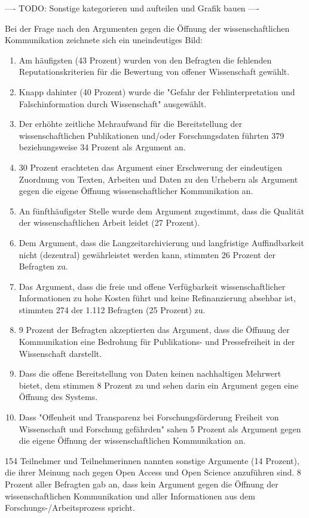 ---- TODO: Sonstige kategorieren und aufteilen und Grafik bauen ----

Bei der Frage nach den Argumenten gegen die Öffnung der wissenschaftlichen Kommunikation zeichnete sich ein uneindeutiges Bild:
\begin{enumerate}
\item Am häufigsten (43 Prozent) wurden von den Befragten die fehlenden Reputationskriterien für die Bewertung von offener Wissenschaft gewählt.
\item Knapp dahinter (40 Prozent) wurde die "Gefahr der Fehlinterpretation und Falschinformation durch Wissenschaft" ausgewählt.
\item Der erhöhte zeitliche Mehraufwand für die Bereitstellung der wissenschaftlichen Publikationen und/oder Forschungsdaten führten 379 beziehungsweise 34 Prozent als Argument an.
\item 30 Prozent erachteten das Argument einer Erschwerung der eindeutigen Zuordnung von Texten, Arbeiten und Daten zu den Urhebern als Argument gegen die eigene Öffnung wissenschaftlicher Kommunikation an.
\item  An fünfthäufigster Stelle wurde dem Argument zugestimmt, dass die Qualität der wissenschaftlichen Arbeit leidet (27 Prozent).
\item Dem Argument, dass die Langzeitarchivierung und langfristige Auffindbarkeit nicht (dezentral) gewährleistet werden kann, stimmten 26 Prozent der Befragten zu.
\item Das Argument, dass die freie und offene Verfügbarkeit wissenschaftlicher Informationen zu hohe Kosten führt und keine Refinanzierung absehbar ist, stimmten 274 der 1.112 Befragten (25 Prozent) zu.
\item 9 Prozent der Befragten akzeptierten das Argument, dass die Öffnung der Kommunikation eine Bedrohung für Publikations- und Pressefreiheit in der Wissenschaft darstellt.
\item Dass die offene Bereitstellung von Daten keinen nachhaltigen Mehrwert bietet, dem stimmen 8 Prozent zu und sehen darin ein Argument gegen eine Öffnung des Systems.
\item Dass "Offenheit und Transparenz bei Forschungsförderung Freiheit von Wissenschaft und Forschung gefährden" sahen 5 Prozent als Argument gegen die eigene Öffnung der wissenschaftlichen Kommunikation an.
\end{enumerate}

154 Teilnehmer und Teilnehmerinnen nannten sonstige Argumente (14 Prozent), die ihrer Meinung nach gegen Open Access und Open Science anzuführen sind. 8 Prozent aller Befragten gab an, dass kein Argument gegen die Öffnung der wissenschaftlichen Kommunikation und aller Informationen aus dem Forschungs-/Arbeitsprozess spricht.

